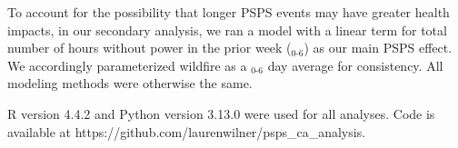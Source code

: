\documentclass[../main.tex]{subfiles}
\begin{document}
To account for the possibility that longer PSPS events may have greater health impacts, in our secondary analysis, we ran a model with a linear term for total number of hours without power in the prior week ($_{0\text{-}6}$) as our main PSPS effect. We accordingly parameterized wildfire \PM as a $_{0\text{-}6}$ day average for consistency. All modeling methods were otherwise the same.

R version 4.4.2 and Python version 3.13.0 were used for all analyses. Code is available at https://github.com/laurenwilner/psps\_ca\_analysis.
\end{document}
